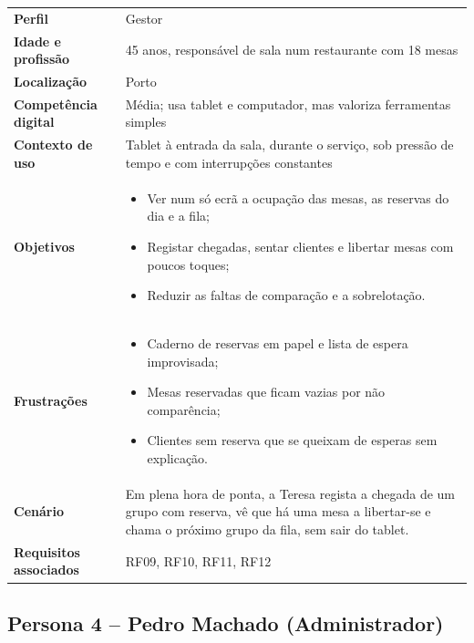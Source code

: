 \begin{tabularx}{\textwidth}{@{}>{\bfseries}p{3.4cm}X@{}}
\toprule
Perfil & Gestor \\
Idade e profissão & 45 anos, responsável de sala num restaurante com 18 mesas \\
Localização & Porto \\
Competência digital & Média; usa tablet e computador, mas valoriza ferramentas simples \\
Contexto de uso & Tablet à entrada da sala, durante o serviço, sob pressão de tempo e com interrupções constantes \\
\midrule
Objetivos &
\begin{itemize}[nosep,leftmargin=*]
  \item Ver num só ecrã a ocupação das mesas, as reservas do dia e a fila;
  \item Registar chegadas, sentar clientes e libertar mesas com poucos toques;
  \item Reduzir as faltas de comparação e a sobrelotação.
\end{itemize} \\
Frustrações &
\begin{itemize}[nosep,leftmargin=*]
  \item Caderno de reservas em papel e lista de espera improvisada;
  \item Mesas reservadas que ficam vazias por não comparência;
  \item Clientes sem reserva que se queixam de esperas sem explicação.
\end{itemize} \\
Cenário &
Em plena hora de ponta, a Teresa regista a chegada de um grupo com reserva, vê que há uma mesa a libertar-se e chama o próximo grupo da fila, sem sair do tablet. \\
Requisitos associados & RF09, RF10, RF11, RF12 \\
\bottomrule
\end{tabularx}
 
\subsection{Persona 4 -- Pedro Machado (Administrador)}
 
